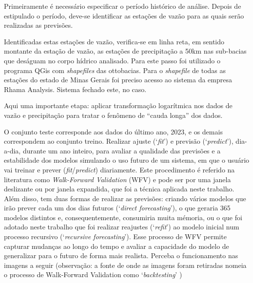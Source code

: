 Primeiramente é necessário especificar o período histórico de análise. Depois de estipulado o período, deve-se identificar as estações de vazão para as quais serão realizadas as previsões.

Identificadas estas estações de vazão, verifica-se em linha reta, em sentido montante da estação de vazão, as estações de precipitação a 50km nas sub-bacias que deságuam no corpo hídrico analisado. Para este passo foi utilizado o programa QGis com \textit{shapefiles} das ottobacias.\cite{snirh_ottobacia_2024} Para o \textit{shapefile} de todas as estações do estado de Minas Gerais foi preciso acesso ao sistema da empresa Rhama Analysis. Sistema fechado este, no caso.


Aqui uma importante etapa: aplicar transformação logarítmica nos dados de vazão e precipitação para tratar o fenômeno de ``cauda longa'' dos dados.

O conjunto teste corresponde aos dados do último ano, 2023, e os demais correspondem ao conjunto treino. Realizar ajuste (`\textit{fit}') e previsão (`\textit{predict}'), dia-a-dia, durante um ano inteiro, para avaliar a qualidade das previsões e a estabilidade dos modelos simulando o uso futuro de um sistema, em que o usuário vai treinar e prever (\textit{fit}/\textit{predict}) diariamente. Este procedimento é referido na literatura como \textit{Walk-Forward Validation} (WFV) e pode ser por uma janela deslizante ou por janela expandida, que foi a técnica aplicada neste trabalho. Além disso, tem duas formas de realizar as previsões: criando vários modelos que irão prever cada um dos dias futuros (`\textit{direct forecasting}'), o que geraria 365 modelos distintos e, consequentemente, consumiria muita mémoria, ou o que foi adotado neste trabalho que foi realizar reajustes (`\textit{refit}') ao modelo inicial num processo recursivo (`\textit{recursive forecasting}'). Esse processo de WFV permite capturar mudanças ao longo do tempo e avaliar a capacidade do modelo de generalizar para o futuro de forma mais realista. Perceba o funcionamento nas imagens a seguir (observação: a fonte de onde as imagens foram retiradas nomeia o processo de Walk-Forward Validation como `\textit{backtesting}' \cite{skforecast_a})

